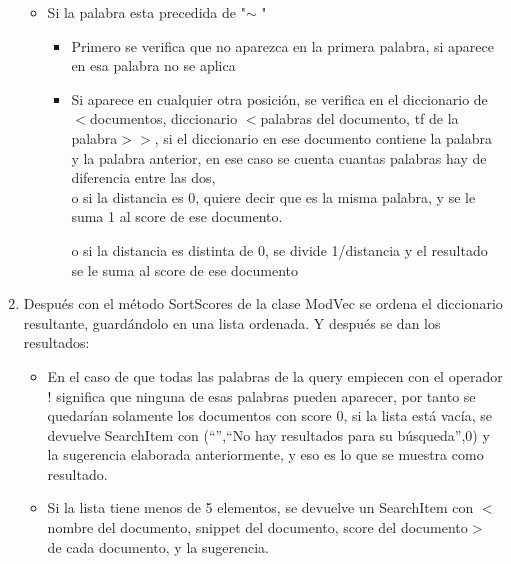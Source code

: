 \documentclass[12pt, a4paper]{article}
\begin{document}
\begin{enumerate}
\begin{itemize}
                  \item Si la palabra esta precedida de  "$\sim$ "
                  \begin{itemize}
                  \item Primero se verifica que no aparezca en la primera palabra,
                        si aparece en esa palabra no se aplica
                  \item Si aparece en cualquier otra posición,
                        se verifica en el diccionario de
                        $<$documentos, diccionario $<$palabras del documento, tf de la palabra$>>$,
                        si el diccionario en ese documento contiene la palabra y la palabra anterior,
                        en ese caso se cuenta cuantas palabras hay de diferencia entre las dos,\\
                        o si la distancia es 0, quiere decir que es la misma palabra, y se le suma 1 al score
                        de ese documento.

                        o si la distancia es distinta de 0, se divide 1/distancia y el resultado se le suma
                        al score de ese documento
                  \end{itemize}

            \end{itemize}

            \item Después con el método SortScores de la clase ModVec se ordena el diccionario
            resultante, guardándolo en una lista ordenada.
            Y después se dan los resultados:
            \begin{itemize}
                  \item En el caso de que todas las palabras de la query empiecen con el operador !
                  significa que ninguna de esas palabras pueden aparecer,
                  por tanto se quedarían solamente los documentos con score 0,
                  si la lista está vacía, se devuelve SearchItem con
                  (“”,“No hay resultados para su búsqueda”,0) y
                  la sugerencia elaborada anteriormente, y eso es lo que se muestra como resultado.
                  
                  \item Si la lista tiene menos de 5 elementos, se devuelve un SearchItem con
                  $<$nombre del documento, snippet del documento, score del documento$>$
                  de cada documento, y la sugerencia.


\end{itemize}
\end{enumerate}
\end{document}
